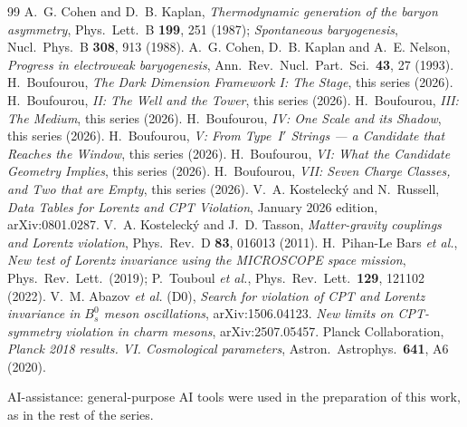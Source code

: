 \documentclass[11pt,a4paper]{article}
\begin{document}
\begin{thebibliography}{99}
 A.~G. Cohen and D.~B. Kaplan,
\emph{Thermodynamic generation of the baryon asymmetry},
Phys.\ Lett.\ B \textbf{199}, 251 (1987);
\emph{Spontaneous baryogenesis}, Nucl.\ Phys.\ B \textbf{308}, 913 (1988).
 A.~G. Cohen, D.~B. Kaplan and A.~E. Nelson,
\emph{Progress in electroweak baryogenesis},
Ann.\ Rev.\ Nucl.\ Part.\ Sci.\ \textbf{43}, 27 (1993).
 H.~Boufourou, \emph{The Dark Dimension Framework I: The Stage},
this series (2026).
 H.~Boufourou, \emph{II: The Well and the Tower}, this series
(2026).
 H.~Boufourou, \emph{III: The Medium}, this series (2026).
 H.~Boufourou, \emph{IV: One Scale and its Shadow}, this series
(2026).
 H.~Boufourou, \emph{V: From Type~I$'$ Strings --- a Candidate
that Reaches the Window}, this series (2026).
 H.~Boufourou, \emph{VI: What the Candidate Geometry Implies},
this series (2026).
 H.~Boufourou, \emph{VII: Seven Charge Classes, and Two that are
Empty}, this series (2026).
 V.~A. Kosteleck\'y and N.~Russell, \emph{Data Tables for Lorentz
and CPT Violation}, January 2026 edition, arXiv:0801.0287.
 V.~A. Kosteleck\'y and J.~D. Tasson, \emph{Matter-gravity
couplings and Lorentz violation}, Phys.\ Rev.\ D \textbf{83}, 016013 (2011).
 H.~Pihan-Le Bars \emph{et al.}, \emph{New test of Lorentz
invariance using the MICROSCOPE space mission}, Phys.\ Rev.\ Lett.\ (2019);
P.~Touboul \emph{et al.}, Phys.\ Rev.\ Lett.\ \textbf{129}, 121102 (2022).
 V.~M. Abazov \emph{et al.} (D0), \emph{Search for violation of
CPT and Lorentz invariance in $B_s^0$ meson oscillations},
arXiv:1506.04123.
 \emph{New limits on CPT-symmetry violation in charm
mesons}, arXiv:2507.05457.
 Planck Collaboration, \emph{Planck 2018 results. VI.
Cosmological parameters}, Astron.\ Astrophys.\ \textbf{641}, A6 (2020).
\end{thebibliography}

\vspace{6pt}
\noindent\small AI-assistance: general-purpose AI tools were used in the
preparation of this work, as in the rest of the series.
\end{document}
